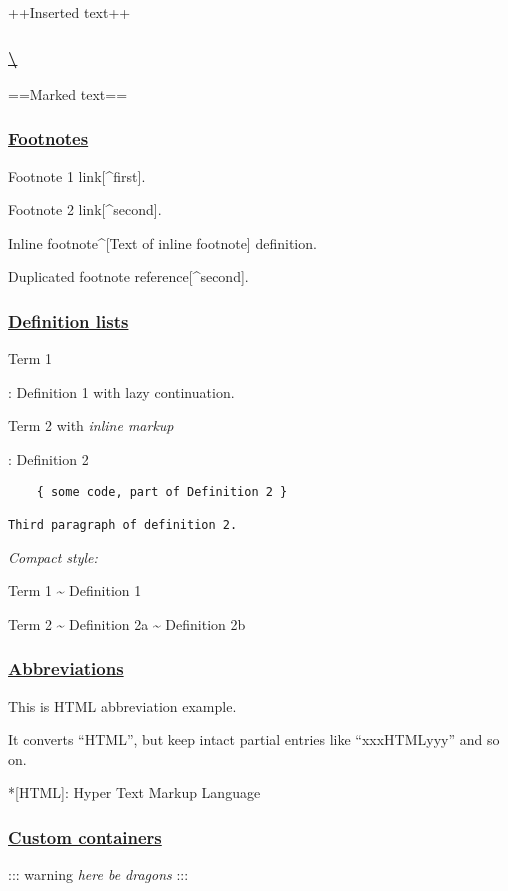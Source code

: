 \documentclass[]{article}
\begin{document}
++Inserted text++

\subsubsection{\texorpdfstring{\href{https://github.com/markdown-it/markdown-it-mark}{\textbackslash{}}}{\textbackslash{}}}

==Marked text==

\subsubsection{\texorpdfstring{\href{https://github.com/markdown-it/markdown-it-footnote}{Footnotes}}{Footnotes}}

Footnote 1 link{[}\^{}first{]}.

Footnote 2 link{[}\^{}second{]}.

Inline footnote\^{}{[}Text of inline footnote{]} definition.

Duplicated footnote reference{[}\^{}second{]}.

\subsubsection{\texorpdfstring{\href{https://github.com/markdown-it/markdown-it-deflist}{Definition
lists}}{Definition lists}}

Term 1

: Definition 1 with lazy continuation.

Term 2 with \emph{inline markup}

: Definition 2

\begin{verbatim}
    { some code, part of Definition 2 }

Third paragraph of definition 2.
\end{verbatim}

\emph{Compact style:}

Term 1 \textasciitilde{} Definition 1

Term 2 \textasciitilde{} Definition 2a \textasciitilde{} Definition 2b

\subsubsection{\texorpdfstring{\href{https://github.com/markdown-it/markdown-it-abbr}{Abbreviations}}{Abbreviations}}

This is HTML abbreviation example.

It converts ``HTML'', but keep intact partial entries like
``xxxHTMLyyy'' and so on.

*{[}HTML{]}: Hyper Text Markup Language

\subsubsection{\texorpdfstring{\href{https://github.com/markdown-it/markdown-it-container}{Custom
containers}}{Custom containers}}

::: warning \emph{here be dragons} :::
\end{document}
